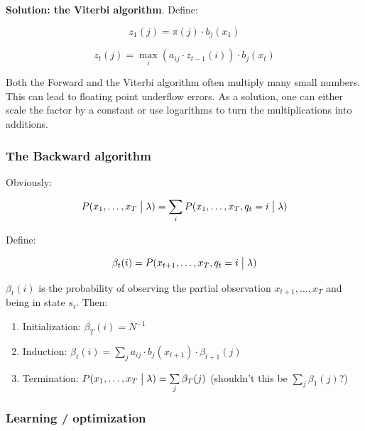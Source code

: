 \documentclass[11pt]{article}
\begin{document}
\textbf{Solution: the Viterbi algorithm}. Define:

\begin{equation}
    z_1(j) = \pi(j) \cdot b_j(x_1)
\end{equation}

\begin{equation}
    z_t(j) = \max_i(a_{ij} \cdot z_{t-1}(i)) \cdot b_j(x_t)
\end{equation}

Both the Forward and the Viterbi algorithm often multiply many small numbers. This can lead to floating point underflow errors. As a solution, one can either scale the factor by a constant or use logarithms to turn the multiplications into additions.

\subsubsection{The Backward algorithm}

Obviously:

\begin{equation}
    P(x_1, \ldots, x_T \bigm| \lambda) = \sum\limits_i P(x_1, \ldots, x_T, q_t = i \bigm| \lambda)
\end{equation}

Define:

\begin{equation}
    \beta_t(i) = P(x_{t+1}, \ldots, x_T, q_t = i \bigm| \lambda)
\end{equation}

\vspace{10pt}

$\beta_t(i)$ is the probability of observing the partial observation $x_{t+1}, \ldots, x_T$ and being in state $s_i$. Then:

\begin{enumerate}
    \item Initialization: $\beta_T(i) = N^{-1}$
    \item Induction: $\beta_t(i) = \sum\limits_j a_{ij} \cdot b_j(x_{t+1}) \cdot \beta_{t+1}(j)$
    \item Termination: $P(x_1, \ldots, x_T \bigm| \lambda) = \sum\limits_j \beta_T(j)$ (shouldn't this be $\sum\limits_j \beta_1(j)$?)
\end{enumerate}

\subsubsection{Learning / optimization}
\end{document}
